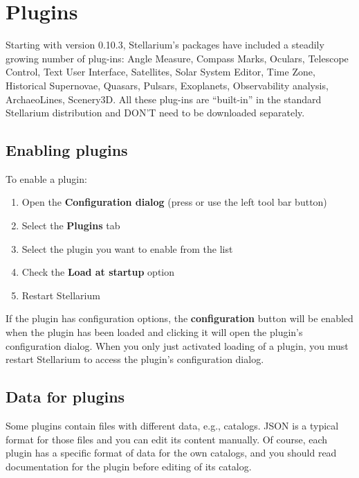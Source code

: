 
\chapter{Plugins}
\label{ch:Plugins}

Starting with version 0.10.3, Stellarium's packages have included a steadily growing number of
plug-ins: Angle Measure, Compass Marks, Oculars, Telescope Control, Text
User Interface, Satellites, Solar System Editor, Time Zone, Historical
Supernovae, Quasars, Pulsars, Exoplanets, Observability analysis, ArchaeoLines, Scenery3D. All
these plug-ins are ``built-in'' in the standard Stellarium distribution
and DON'T need to be downloaded separately.


\section{Enabling plugins}
\label{sec:Plugins:EnablingPlugins}


To enable a plugin:

\begin{enumerate}
\item
  Open the \textbf{Configuration dialog} (press  or use the left tool
  bar button)
\item
  Select the \textbf{Plugins} tab
\item
  Select the plugin you want to enable from the list
\item
  Check the \textbf{Load at startup} option
\item
  Restart Stellarium
\end{enumerate}

If the plugin has configuration options, the \textbf{configuration}
button will be enabled when the plugin has been loaded and clicking it
will open the plugin's configuration dialog. When you only just
activated loading of a plugin, you must restart Stellarium to access
the plugin's configuration dialog.

\section{Data for plugins}
\label{sec:Plugins:DataForPlugins}

Some plugins contain files with different data, e.g., catalogs. JSON is a
typical format for those files and you can edit its content manually. Of
course, each plugin has a specific format of data for the own catalogs, and
you should read documentation for the plugin before editing of its catalog.


